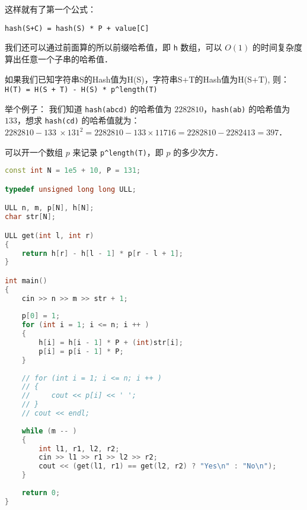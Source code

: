 这样就有了第一个公式：

\verb|hash(S+C) = hash(S) * P + value[C]|

我们还可以通过前面算的所以前缀哈希值，即 \verb|h| 数组，可以 $O(1)$ 的时间复杂度算出任意一个子串的哈希值．

如果我们已知字符串S的Hash值为H(S)，字符串S+T的Hash值为H(S+T),
则：\verb|H(T) = H(S + T) - H(S) * p^length(T)|

举个例子：
我们知道 \verb|hash(abcd)| 的哈希值为 $2282810$，\verb|hash(ab)| 的哈希值为 $133$，想求 \verb|hash(cd)| 的哈希值就为：
$2282810 - 133\  \times 131^2 = 2282810 - 133 \times 11716 = 2282810 - 2282413 = 397$．

可以开一个数组 $p$ 来记录 \verb|p^length(T)|，即 $p$ 的多少次方．

\begin{lstlisting}[language=cpp]
const int N = 1e5 + 10, P = 131;

typedef unsigned long long ULL;

ULL n, m, p[N], h[N];
char str[N];

ULL get(int l, int r)
{
    return h[r] - h[l - 1] * p[r - l + 1];
}

int main()
{
    cin >> n >> m >> str + 1;
    
    p[0] = 1;
    for (int i = 1; i <= n; i ++ )
    {
        h[i] = h[i - 1] * P + (int)str[i];
        p[i] = p[i - 1] * P;
    }
    
    // for (int i = 1; i <= n; i ++ )
    // {
    //     cout << p[i] << ' ';
    // }
    // cout << endl;
    
    while (m -- )
    {
        int l1, r1, l2, r2;
        cin >> l1 >> r1 >> l2 >> r2;
        cout << (get(l1, r1) == get(l2, r2) ? "Yes\n" : "No\n");
    }
    
    return 0;
}

\end{lstlisting}